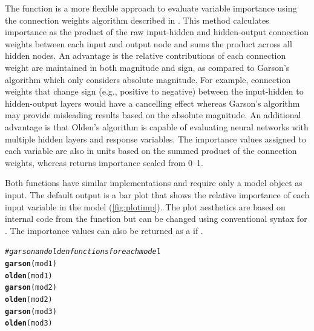 \documentclass[article,shortnames]{jss}\usepackage[]{graphicx}\usepackage[]{color}
\makeatletter
\newcommand{\hlcom}[1]{\textcolor[rgb]{0.678,0.584,0.686}{\textit{#1}}}%
\newcommand{\hlstd}[1]{\textcolor[rgb]{0.345,0.345,0.345}{#1}}%
\newcommand{\hlkwd}[1]{\textcolor[rgb]{0.737,0.353,0.396}{\textbf{#1}}}%
\newenvironment{kframe}{%
 \def\at@end@of@kframe{}%
 \ifinner\ifhmode%
  \def\at@end@of@kframe{\end{minipage}}%
  \begin{minipage}{\columnwidth}%
 \fi\fi%
 \def\FrameCommand##1{\hskip\@totalleftmargin \hskip-\fboxsep
 \colorbox{shadecolor}{##1}\hskip-\fboxsep
     \hskip-\linewidth \hskip-\@totalleftmargin \hskip\columnwidth}%
 \MakeFramed {\advance\hsize-\width
   \@totalleftmargin\z@ \linewidth\hsize
   \@setminipage}}%
 {\par\unskip\endMakeFramed%
 \at@end@of@kframe}
\makeatother
\begin{document}
The  function is a more flexible approach to evaluate variable importance using the connection weights algorithm described in \citet{Olden04}. This method calculates importance as the product of the raw input-hidden and hidden-output connection weights between each input and output node and sums the product across all hidden nodes. An advantage is the relative contributions of each connection weight are maintained in both magnitude and sign, as compared to Garson's algorithm which only considers absolute magnitude. For example, connection weights that change sign (e.g., positive to negative) between the input-hidden to hidden-output layers would have a cancelling effect whereas Garson's algorithm may provide misleading results based on the absolute magnitude. An additional advantage is that Olden's algorithm is capable of evaluating neural networks with multiple hidden layers and response variables. The importance values assigned to each variable are also in units based on the summed product of the connection weights, whereas  returns importance scaled from 0--1.

Both functions have similar implementations and require only a model object as input.  The default output is a  bar plot \citep[i.e., ,][]{Wickham09} that shows the relative importance of each input variable in the model (\cref{fig:plotimp}).  The plot aesthetics are based on internal code from the function but can be changed using conventional syntax for .  The importance values can also be returned as a  if .  

\begin{kframe}
\begin{alltt}
\hlcom{# garson and olden functions for each model}
\hlkwd{garson}\hlstd{(mod1)}
\hlkwd{olden}\hlstd{(mod1)}
\hlkwd{garson}\hlstd{(mod2)}
\hlkwd{olden}\hlstd{(mod2)}
\hlkwd{garson}\hlstd{(mod3)}
\hlkwd{olden}\hlstd{(mod3)}
\end{alltt}
\end{kframe}
\end{document}
